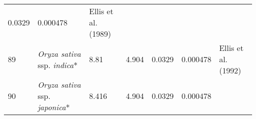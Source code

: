 \documentclass[]{article}
\begin{document}
\begin{longtable}[]{@{}lllllll@{}}
\begin{minipage}[t]{0.08\columnwidth}
0.0329\strut
\end{minipage} & \begin{minipage}[t]{0.08\columnwidth}\raggedright
0.000478\strut
\end{minipage} & \begin{minipage}[t]{0.23\columnwidth}\raggedright
Ellis et al. (1989)\strut
\end{minipage}\tabularnewline
\begin{minipage}[t]{0.05\columnwidth}\raggedright
89\strut
\end{minipage} & \begin{minipage}[t]{0.23\columnwidth}\raggedright
\emph{Oryza sativa} ssp. \emph{indica}*\strut
\end{minipage} & \begin{minipage}[t]{0.05\columnwidth}\raggedright
8.81\strut
\end{minipage} & \begin{minipage}[t]{0.08\columnwidth}\raggedright
4.904\strut
\end{minipage} & \begin{minipage}[t]{0.08\columnwidth}\raggedright
0.0329\strut
\end{minipage} & \begin{minipage}[t]{0.08\columnwidth}\raggedright
0.000478\strut
\end{minipage} & \begin{minipage}[t]{0.23\columnwidth}\raggedright
Ellis et al. (1992)\strut
\end{minipage}\tabularnewline
\begin{minipage}[t]{0.05\columnwidth}\raggedright
90\strut
\end{minipage} & \begin{minipage}[t]{0.23\columnwidth}\raggedright
\emph{Oryza sativa} ssp. \emph{japonica}*\strut
\end{minipage} & \begin{minipage}[t]{0.05\columnwidth}\raggedright
8.416\strut
\end{minipage} & \begin{minipage}[t]{0.08\columnwidth}\raggedright
4.904\strut
\end{minipage} & \begin{minipage}[t]{0.08\columnwidth}\raggedright
0.0329\strut
\end{minipage} & \begin{minipage}[t]{0.08\columnwidth}\raggedright
0.000478\strut
\end{minipage} & \begin{minipage}[t]{0.23\columnwidth}\raggedright

\end{minipage}
\end{longtable}
\end{document}
